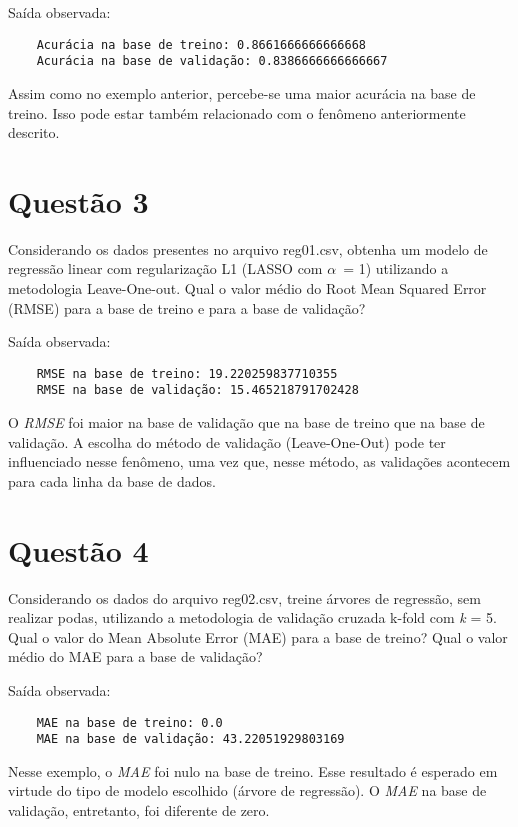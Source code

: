 \documentclass[11pt]{article}
\begin{document}


Saída observada:

\begin{lstlisting}
    Acurácia na base de treino: 0.8661666666666668
    Acurácia na base de validação: 0.8386666666666667
\end{lstlisting}

Assim como no exemplo anterior, percebe-se uma maior acurácia na base de treino. Isso pode estar também relacionado com o fenômeno anteriormente descrito.

\section{Questão 3}

Considerando os dados presentes no arquivo reg01.csv, obtenha um modelo de regressão linear com regularização L1 (LASSO com $\alpha$\ = 1) utilizando a metodologia Leave-One-out. Qual o valor médio do Root Mean Squared Error (RMSE) para a base de treino e para a base de validação?



Saída observada:

\begin{lstlisting}
    RMSE na base de treino: 19.220259837710355
    RMSE na base de validação: 15.465218791702428
\end{lstlisting}

O \emph{RMSE} foi maior na base de validação que na base de treino que na base de validação. A escolha do método de validação (Leave-One-Out) pode ter influenciado nesse fenômeno, uma vez que, nesse método, as validações acontecem para cada linha da base de dados.

\section{Questão 4}

Considerando os dados do arquivo reg02.csv, treine árvores de regressão, sem realizar podas, utilizando a metodologia de validação cruzada k-fold com \emph{k} = 5. Qual o valor do Mean Absolute Error (MAE) para a base de treino? Qual o valor médio do MAE para a base de validação?


    
Saída observada:

\begin{lstlisting}
    MAE na base de treino: 0.0
    MAE na base de validação: 43.22051929803169
\end{lstlisting}

Nesse exemplo, o \emph{MAE} foi nulo na base de treino. Esse resultado é esperado em virtude do tipo de modelo escolhido (árvore de regressão). O \emph{MAE} na base de validação, entretanto, foi diferente de zero.
\end{document}
